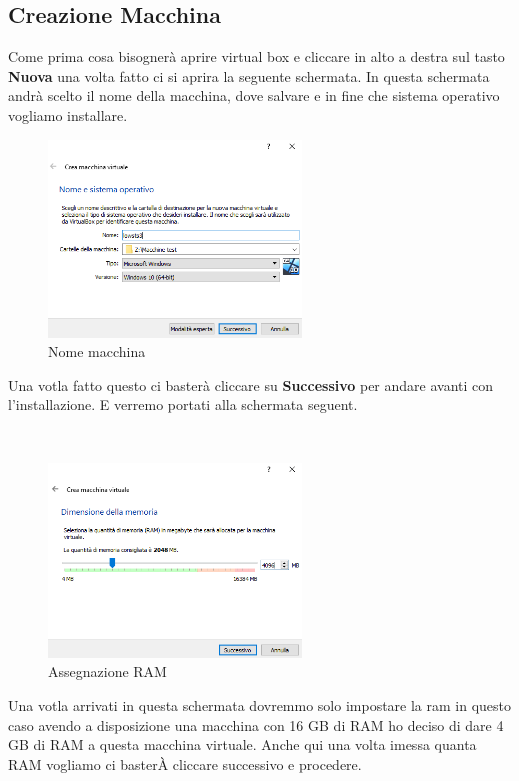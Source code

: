 \documentclass[../main.tex]{subfiles}
\begin{document}
\subsection{Creazione Macchina}
Come prima cosa bisognerà aprire virtual box e cliccare in alto a destra sul tasto \textbf{Nuova} una volta fatto ci si aprira la seguente schermata. In questa schermata andrà scelto il nome della macchina, dove salvare e in fine che sistema operativo vogliamo installare. 

\begin{figure}[h]
    \centering
    \includegraphics[width=0.6\textwidth]{Images/set-up1.PNG}
    \caption{Nome macchina}
\end{figure}
  Una votla fatto questo ci basterà cliccare su \textbf{Successivo} per andare avanti con l'installazione. E verremo portati alla schermata seguent.
  
\

\begin{figure}[h]
    \centering
    \includegraphics[width=0.6\textwidth]{Images/set-up2.PNG}
    \caption{Assegnazione RAM}
\end{figure}

\pagebreak{}
\thispagestyle{header-pages}

Una votla arrivati in questa schermata dovremmo solo impostare la ram in questo caso avendo a disposizione una macchina con 16 GB di RAM ho deciso di dare 4 GB di RAM a questa macchina virtuale. Anche qui una volta imessa quanta RAM vogliamo ci basterÀ cliccare successivo e procedere.
\end{document}
